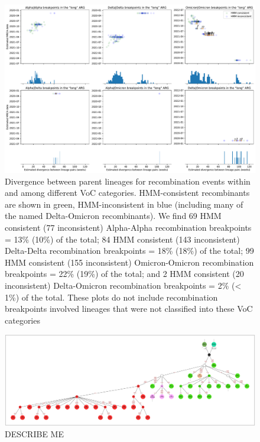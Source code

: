 \documentclass{article}
\begin{document}
\begin{figure} \centering
\includegraphics[width=\textwidth]{figures/supp_recombination_node_mrcas.pdf}
\caption{\label{fig:recomb_mrcas_voc_breakdown}  Divergence between parent lineages for recombination events within and among different VoC categories. HMM-consistent recombinants are shown in green, HMM-inconsistent in blue (including many of the named Delta-Omicron recombinants). We find 69 HMM consistent (77 inconsistent) Alpha-Alpha recombination breakpoints = 13\% (10\%) of the total; 84 HMM consistent (143 inconsistent) Delta-Delta recombination breakpoints = 18\% (18\%) of the total; 99 HMM consistent (155 inconsistent) Omicron-Omicron recombination breakpoints = 22\% (19\%) of the total; and 2 HMM consistent (20 inconsistent) Delta-Omicron recombination breakpoints = 2\% (< 1\%) of the total. These plots do not include recombination breakpoints involved lineages that were not classified into these VoC categories}
\end{figure}

\begin{figure} \centering
\includegraphics[width=\textwidth]{figures/Pango_XAG_gisaid_large_graph.pdf}
\caption{\label{fig:pango_XAG_gisaid_graph}  DESCRIBE ME}
\end{figure}
\end{document}
